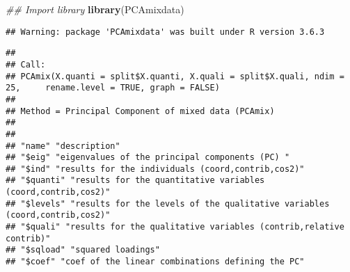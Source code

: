 \documentclass[
]{article}
\newenvironment{Shaded}{\begin{snugshade}}{\end{snugshade}}
\newcommand{\CommentTok}[1]{\textcolor[rgb]{0.56,0.35,0.01}{\textit{#1}}}
\newcommand{\DataTypeTok}[1]{\textcolor[rgb]{0.13,0.29,0.53}{#1}}
\newcommand{\DecValTok}[1]{\textcolor[rgb]{0.00,0.00,0.81}{#1}}
\newcommand{\KeywordTok}[1]{\textcolor[rgb]{0.13,0.29,0.53}{\textbf{#1}}}
\newcommand{\NormalTok}[1]{#1}
\newcommand{\OperatorTok}[1]{\textcolor[rgb]{0.81,0.36,0.00}{\textbf{#1}}}
\newcommand{\OtherTok}[1]{\textcolor[rgb]{0.56,0.35,0.01}{#1}}
\newcommand{\StringTok}[1]{\textcolor[rgb]{0.31,0.60,0.02}{#1}}
\begin{document}
\begin{Shaded}
\begin{Highlighting}[]
\CommentTok{## Import library}
\KeywordTok{library}\NormalTok{(PCAmixdata)}
\end{Highlighting}
\end{Shaded}

\begin{verbatim}
## Warning: package 'PCAmixdata' was built under R version 3.6.3
\end{verbatim}

\begin{Shaded}
\end{Shaded}

\begin{verbatim}
## 
## Call:
## PCAmix(X.quanti = split$X.quanti, X.quali = split$X.quali, ndim = 25,     rename.level = TRUE, graph = FALSE)
## 
## Method = Principal Component of mixed data (PCAmix)
## 
## 
## "name" "description"
## "$eig" "eigenvalues of the principal components (PC) "
## "$ind" "results for the individuals (coord,contrib,cos2)"
## "$quanti" "results for the quantitative variables (coord,contrib,cos2)"
## "$levels" "results for the levels of the qualitative variables (coord,contrib,cos2)"
## "$quali" "results for the qualitative variables (contrib,relative contrib)"
## "$sqload" "squared loadings"
## "$coef" "coef of the linear combinations defining the PC"
\end{verbatim}

\begin{Shaded}
\end{Shaded}
\end{document}
